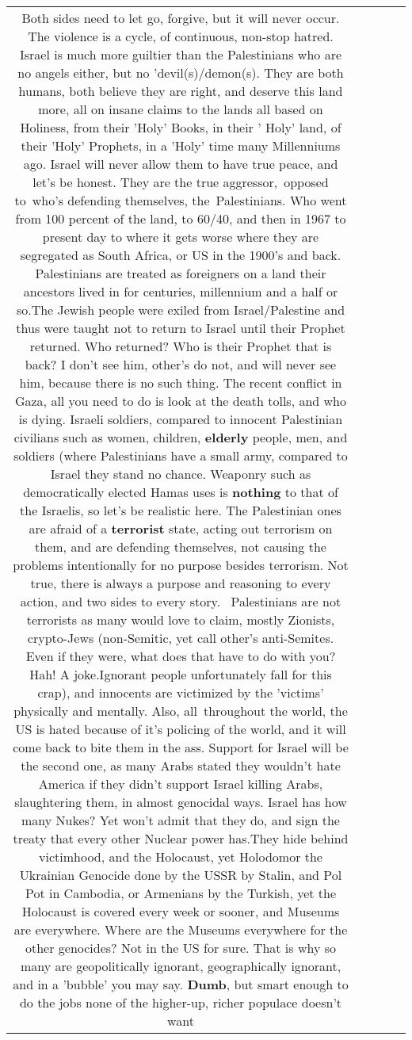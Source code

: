 \documentclass[11pt]{article}
\newlength\mylength
\begin{document}
\begin{center}
\begin{longtable}{|C{.65\mylength}|C{.30\mylength}|C{.12\mylength}|C{.12\mylength}|C{.12\mylength}|}
  \small Both sides need to let go, forgive, but it will never occur. The violence is a cycle, of continuous, non-stop hatred. Israel is much more guiltier than the Palestinians who are no angels either, but no 'devil(s)/demon(s). They are both humans, both believe they are right, and deserve this land more, all on insane claims to the lands all based on Holiness, from their 'Holy' Books, in their ' Holy' land, of their 'Holy' Prophets, in a 'Holy' time many Millenniums ago. Israel will never allow them to have true peace, and let's be honest. They are the true aggressor, opposed to who's defending themselves, the Palestinians. Who went from 100 percent of the land, to 60/40, and then in 1967 to present day to where it gets worse where they are segregated as South Africa, or US in the 1900's and back. Palestinians are treated as foreigners on a land their ancestors lived in for centuries, millennium and a half or so.The Jewish people were exiled from Israel/Palestine and thus were taught not to return to Israel until their Prophet returned. Who returned? Who is their Prophet that is back? I don't see him, other's do not, and will never see him, because there is no such thing. The recent conflict in Gaza, all you need to do is look at the death tolls, and who is dying. Israeli soldiers, compared to innocent Palestinian civilians such as women, children, \textbf{elderly} people, men, and soldiers (where Palestinians have a small army, compared to Israel they stand no chance. Weaponry such as democratically elected Hamas uses is \textbf{nothing} to that of the Israelis, so let's be realistic here. The Palestinian ones are afraid of a \textbf{terrorist} state, acting out terrorism on them, and are defending themselves, not causing the problems intentionally for no purpose besides terrorism. Not true, there is always a purpose and reasoning to every action, and two sides to every story.  Palestinians are not terrorists as many would love to claim, mostly Zionists, crypto-Jews (non-Semitic, yet call other's anti-Semites. Even if they were, what does that have to do with you? Hah! A joke.Ignorant people unfortunately fall for this crap), and innocents are victimized by the 'victims' physically and mentally. Also, all throughout the world, the US is hated because of it's policing of the world, and it will come back to bite them in the ass. Support for Israel will be the second one, as many Arabs stated they wouldn't hate America if they didn't support Israel killing Arabs, slaughtering them, in almost genocidal ways. Israel has how many Nukes? Yet won't admit that they do, and sign the treaty that every other Nuclear power has.They hide behind victimhood, and the Holocaust, yet Holodomor the Ukrainian Genocide done by the USSR by Stalin, and Pol Pot in Cambodia, or Armenians by the Turkish, yet the Holocaust is covered every week or sooner, and Museums are everywhere. Where are the Museums everywhere for the other genocides? Not in the US for sure. That is why so many are geopolitically ignorant, geographically ignorant, and in a 'bubble' you may say. \textbf{Dumb}, but smart enough to do the jobs none of the higher-up, richer populace doesn't want 
\end{longtable}
\end{center}
\end{document}
